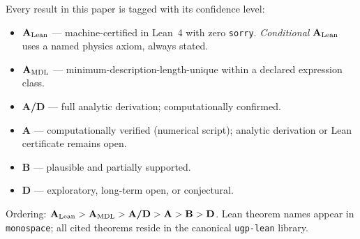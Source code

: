 \documentclass[11pt]{article}
\theoremstyle{remark}
\newcommand{\lean}[1]{%
  \penalty-100
  \begingroup\def\_{\textunderscore\allowbreak}\texttt{#1}\endgroup}
\newcommand{\CatA}{\textbf{A}}
\newcommand{\CatAL}{\ensuremath{\textbf{A}_{\rm Lean}}}
\newcommand{\CatAMDL}{\ensuremath{\textbf{A}_{\rm MDL}}}
\newcommand{\CatAD}{\textbf{A/D}}
\newcommand{\CatB}{\textbf{B}}
\newcommand{\CatD}{\textbf{D}}
\begin{document}
\begin{tcolorbox}[colback=gray!7,colframe=gray!55!black,
  title={\textbf{Claim-strength taxonomy}},
  fonttitle=\bfseries,left=6pt,right=6pt,top=5pt,bottom=5pt,breakable]
\small
Every result in this paper is tagged with its confidence level:
\begin{itemize}[noitemsep,topsep=2pt]
  \item \textbf{\CatAL} — machine-certified in Lean~4 with zero \texttt{sorry}.
        \emph{Conditional} \CatAL{} uses a named physics axiom, always stated.
  \item \textbf{\CatAMDL} — minimum-description-length-unique within a declared
        expression class.
  \item \textbf{\CatAD} — full analytic derivation; computationally confirmed.
  \item \textbf{\CatA} — computationally verified (numerical script); analytic
        derivation or Lean certificate remains open.
  \item \textbf{\CatB} — plausible and partially supported.
  \item \textbf{\CatD} — exploratory, long-term open, or conjectural.
\end{itemize}
Ordering: $\CatAL > \CatAMDL > \CatAD > \CatA > \CatB > \CatD$. Lean theorem
names appear in \lean{monospace}; all cited theorems reside in the canonical
\texttt{ugp-lean} library.
\end{tcolorbox}
\end{document}
